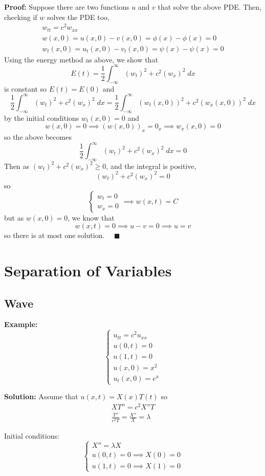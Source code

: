 \documentclass[12pt]{article}
\newcommand{\qed}{\quad \blacksquare}
\begin{document}
\textbf{Proof:} Suppose there are two functions $u$ and $v$ that solve the above PDE. Then, checking if $w$ solves the PDE too,
\begin{gather*}
    w_{tt} = c^2 w_{xx}\\
    w(x, 0) = u(x, 0) - v(x, 0) = \phi(x) - \phi(x) = 0\\
    w_t(x, 0) = u_t(x, 0) - v_t(x, 0) = \psi(x) - \psi(x) = 0
\end{gather*}
Using the energy method as above, we show that 
\[E(t) = \frac{1}{2}\int_{-\infty}^{\infty} (w_t)^2 + c^2(w_x)^2\; dx\]
is constant so $E(t) = E(0)$ and 
\[\frac{1}{2}\int_{-\infty}^{\infty} (w_t)^2 + c^2(w_x)^2\; dx = \frac{1}{2}\int_{-\infty}^{\infty} (w_t(x, 0))^2 + c^2(w_x(x, 0))^2 \; dx\]
by the initial conditions $w_t(x, 0) = 0$ and 
\[w(x, 0) = 0 \implies (w(x, 0))_x = 0_x \implies w_x(x, 0) = 0\]
so the above becomes 
\[\frac{1}{2}\int_{-\infty}^{\infty} (w_t)^2 + c^2(w_x)^2 \; dx =0\]
Then as $(w_t)^2 + c^2(w_x)^2 \geq 0$, and the integral is positive, 
\[(w_t)^2 + c^2(w_x)^2 = 0\]
so 
\[\begin{cases}
    w_t = 0\\
    w_x = 0
\end{cases} \implies w(x, t) = C\]
but as $w(x, 0) = 0$, we know that 
\[w(x, t) = 0 \implies u - v= 0 \implies u = v\]
so there is at most one solution. $\qed$

\section{Separation of Variables}
\subsection{Wave}
\textbf{Example:} 
\[\begin{cases}
    u_{tt} = c^2u_{xx}\\
    u(0, t) = 0\\
    u(1, t) = 0\\
    u(x, 0) = x^2\\
    u_t(x, 0) = e^x
\end{cases}\]

\textbf{Solution:}
Assume that $u(x, t) = X(x)T(t)$ so 
\begin{gather*}
    XT'' = c^2X''T\\
    \frac{T''}{c^2T} = \frac{X''}{X} = \lambda
\end{gather*}

Initial conditions:
\[\begin{cases*}
    X'' = \lambda X\\
    u(0, t) = 0 \implies X(0) = 0\\
    u(1, t) = 0 \implies X(1) = 0
\end{cases*}\]
\end{document}
